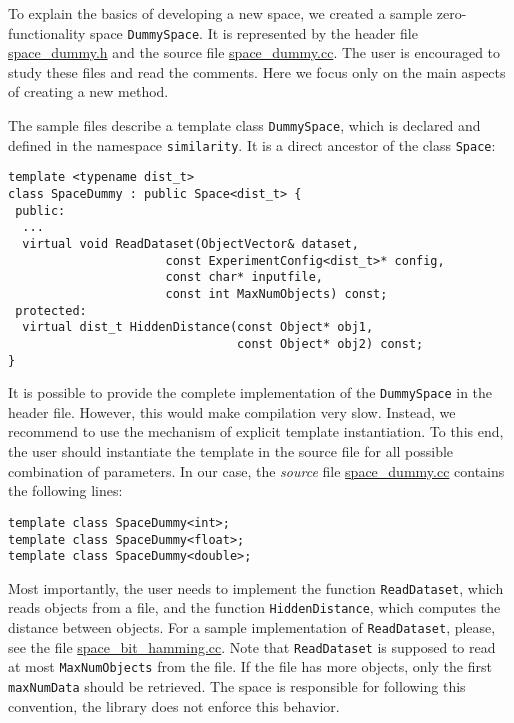 \documentclass[runningheads,a4paper]{llncs}
\newcommand{\ttt}[1]{\texttt{#1}}
\begin{document}
{To explain the basics of developing a new space,
we created a sample zero-functionality space \texttt{DummySpace}.
It is represented by 
the header file 
\href{https://github.com/searchivarius/NonMetricSpaceLib/blob/master/similarity_search/include/space/space_dummy.h}{space\_dummy.h}
and the source file
\href{https://github.com/searchivarius/NonMetricSpaceLib/blob/master/similarity_search/src/space/space_dummy.cc}{space\_dummy.cc}.
The user is encouraged to study these files and read the comments.
Here we focus only on the main aspects of creating a new method.
\newpage

The sample files describe a template class \ttt{DummySpace}, 
which is declared and defined in the namespace \ttt{similarity}.
It is a direct ancestor of the class \ttt{Space}:
\begin{verbatim}
template <typename dist_t>
class SpaceDummy : public Space<dist_t> {
 public:
  ...
  virtual void ReadDataset(ObjectVector& dataset,
                      const ExperimentConfig<dist_t>* config,
                      const char* inputfile,
                      const int MaxNumObjects) const;
 protected:
  virtual dist_t HiddenDistance(const Object* obj1, 
                                const Object* obj2) const;
}
\end{verbatim}
It is possible to provide the complete implementation of the \ttt{DummySpace}
in the header file. However, this would make compilation very slow.
Instead, we recommend to use the mechanism of explicit template instantiation.
To this end, the user should instantiate the template in the source file
for all possible combination of parameters.
In our case, the \emph{source} file 
\href{https://github.com/searchivarius/NonMetricSpaceLib/blob/master/similarity_search/src/space/space_dummy.cc}{space\_dummy.cc}
contains the following lines:
\begin{verbatim}
template class SpaceDummy<int>;
template class SpaceDummy<float>;
template class SpaceDummy<double>;
\end{verbatim}

Most importantly, the user needs to implement the function \ttt{ReadDataset},
which reads objects from a file, and the function \ttt{HiddenDistance},
which computes the distance between objects.
For a sample implementation of \ttt{ReadDataset},
please, see the file
\href{https://github.com/searchivarius/NonMetricSpaceLib/blob/master/similarity_search/src/space/space_bit_hamming.cc}{space\_bit\_hamming.cc}.
Note that \ttt{ReadDataset} is supposed to read at most \ttt{MaxNumObjects}
from the file. If the file has more objects, only the first \ttt{maxNumData} should be retrieved.
The space is responsible for following this convention, the library does not enforce this behavior.

}
\end{document}
